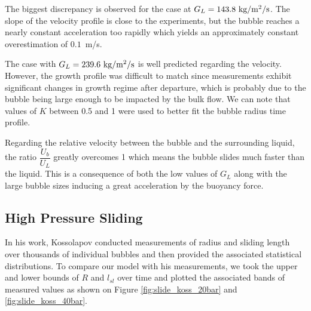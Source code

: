 \npar

The biggest discrepancy is observed for the case at $G_{L}=143.8~ \text{kg/m$^{2}$/s}$. The slope of the velocity profile is close to the experiments, but the bubble reaches a nearly constant acceleration too rapidly which yields an approximately constant overestimation of $0.1$~m/s.

\npar

The case with $G_{L}=239.6~ \text{kg/m$^{2}$/s}$ is well predicted regarding the velocity. However, the growth profile was difficult to match since measurements exhibit significant changes in growth regime after departure, which is probably due to the bubble being large enough to be impacted by the bulk flow. We can note that values of $K$ between 0.5 and 1 were used to better fit the bubble radius time profile.

\npar

Regarding the relative velocity between the bubble and the surrounding liquid, the ratio $\dfrac{U_{b}}{U_{L}}$ greatly overcomes 1 which means the bubble slides much faster than the liquid. This is a consequence of both the low values of $G_{L}$ along with the large bubble sizes inducing a great acceleration by the buoyancy force.






\subsection{High Pressure Sliding}

In his work, Kossolapov \cite{kossolapov_experimental_2021} conducted measurements of radius and sliding length over thousands of individual bubbles and then provided the associated statistical distributions. To compare our model with his measurements, we took the upper and lower bounds of $R$ and $l_{sl}$ over time and plotted the associated bands of measured values as shown on Figure \ref{fig:slide_koss_20bar} and \ref{fig:slide_koss_40bar}.


